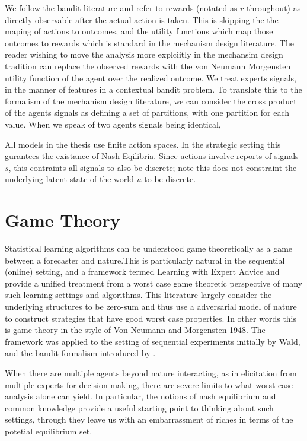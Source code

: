 We follow the bandit literature and refer to rewards (notated as $r$ throughout) as directly observable after the actual action is taken. This is skipping the the maping of actions to outcomes, and the utility functions which map those outcomes to rewards which is standard in the mechanism design literature. The reader wishing to move the analysis more explciitly in the mechansim design tradition can replace the observed rewards with the von Neumann Morgensten utility function of the agent over the realized outcome.
We treat experts signals, in the manner of features in a contextual bandit problem. To translate this to the formalism of the mechanism design literature, we can consider the cross product of the agents signals as defining a set of partitions, with one partition for each value. 
When we speak of two agents signals being identical, 


All models in the thesis use finite action spaces. 
In the strategic setting this gurantees the existance of Nash Eqilibria. 
Since actions involve reports of signals $s$, this contraints all signals to also be discrete; note this does not constraint the underlying latent state of the world $u$ to be discrete.



\section{Game Theory}

Statistical learning algorithms can be understood game theoretically as a game between a forecaster and nature.This is particularly natural in the sequential (online) setting, and a framework termed Learning with Expert Advice and \cite{cesa2006prediction} provide a unified treatment from a worst case game theoretic perspective of many such learning settings and algorithms.
This literature largely consider the underlying structures to be zero-sum and thus use a adversarial model of nature to construct strategies that have good worst case properties. In other words this is game theory in the style of Von Neumann and Morgensten 1948. The framework was applied to the setting of sequential experiments initially by Wald, and the bandit formalism introduced by \cite{robbins1952some}.

When there are multiple agents beyond nature interacting, as in elicitation from multiple experts for decision making, there are severe limits to what worst case analysis alone can yield. 
In particular, the notions of nash equilibrium \cite{nash1950equilibrium} and common knowledge \cite{aumann1976agreeing} provide a useful starting point to thinking about such settings, through they leave us with an embarrassment of riches in terms of the potetial equilibrium set.



